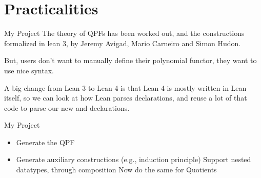 \documentclass[t,12pt]{beamer}
\begin{document}
\section*{Practicalities}

\begin{frame}{My Project}
    The theory of QPFs has been worked out, and the constructions formalized in lean 3, 
    by Jeremy Avigad, Mario Carneiro and Simon Hudon.

    \bigskip

    But, users don't want to manually define their polynomial functor, 
    they want to use nice  syntax.

    \bigskip

    A big change from Lean 3 to Lean 4 is that Lean 4 is mostly written in Lean itself, 
    so we can look at how Lean parses  declarations, and reuse a lot of that code
    to parse our new  and  declarations.

\end{frame}

\begin{frame}{My Project}

    \begin{itemize}
         Port existing work to Lean 4
         Implement a  macro that can parse nice syntax
        \item Generate the QPF
        \item Generate auxiliary constructions (e.g., induction principle)
         Support nested datatypes, through composition
         Now do the same for 
         Quotients
    \end{itemize}
\end{frame}
\end{document}
